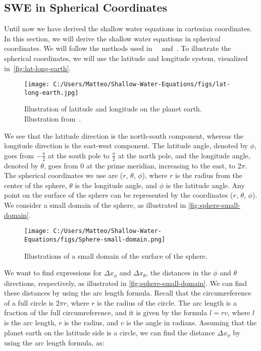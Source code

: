 \subsection{SWE in Spherical Coordinates}
Until now we have derived the shallow water equations in cartesian coordinates.
In this section, we will derive the shallow water equations in spherical coordinates.
We will follow the methods used in~\cite{Castro2017}~\cite{Bihlo2022} and~\cite{Raymond}.
To illustrate the spherical coordinates, we will use the latitude and longitude system, visualized in~\autoref{fig:lat-long-earth}.
\begin{figure}[H]
    \centering
    \texttt{[image: C:/Users/Matteo/Shallow-Water-Equations/figs/lat-long-earth.jpg]}
    \caption{Illustration of latitude and longitude on the planet earth.
    Illustration from~\cite{lat-long-earth}.}\label{fig:lat-long-earth}
\end{figure}
We see that the latitude direction is the north-south component, whereas the longitude direction is the east-west component.
The latitude angle, denoted by $\phi$, goes from $-\frac{\pi}{2}$ at the south pole to $\frac{\pi}{2}$ at the north pole, and the longitude angle, denoted by $\theta$, goes from $0$ at the prime meridian, increasing to the east, to $2\pi$.
The spherical coordinates we use are ($r$, $\theta$, $\phi$), where $r$ is the radius from the center of the sphere, $\theta$ is the longitude angle, and $\phi$ is the latitude angle.
Any point on the surface of the sphere can be represented by the coordinates ($r$, $\theta$, $\phi$).
We consider a small domain of the sphere, as illustrated in \autoref{fig:sphere-small-domain}.
\begin{figure}[H]
    \centering
    \texttt{[image: C:/Users/Matteo/Shallow-Water-Equations/figs/Sphere-small-domain.png]}
    \caption{Illustrations of a small domain of the surface of the sphere.}\label{fig:sphere-small-domain}
\end{figure}
We want to find expressions for $\Delta x_{\phi}$ and $\Delta x_{\theta}$, the distances in the $\phi$ and $\theta$ directions, respectively, as illustrated in \autoref{fig:sphere-small-domain}.
We can find these distances by using the arc length formula.
Recall that the circumreference of a full circle is $2\pi r$, where $r$ is the radius of the circle.
The arc length is a fraction of the full circumreference, and it is given by the formula $l = r v$, where $l$ is the arc length, $r$ is the radius, and $v$ is the angle in radians.
Assuming that the planet earth on the latitude side is a circle, we can find the distance $\Delta x_{\phi}$ by using the arc length formula, as:
